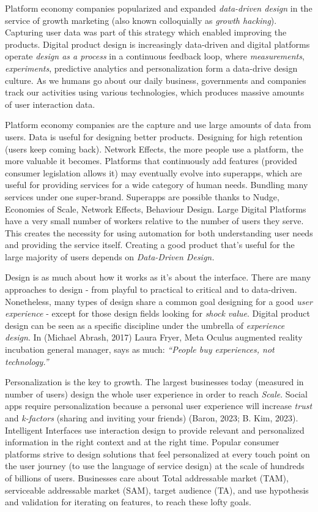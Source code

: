 \documentclass[
  12pt,
  letterpaper,
  DIV=11,
  numbers=noendperiod]{scrartcl}
\begin{document}
Platform economy companies popularized and expanded \emph{data-driven
design} in the service of growth marketing (also known colloquially as
\emph{growth hacking}). Capturing user data was part of this strategy
which enabled improving the products. Digital product design is
increasingly data-driven and digital platforms operate \emph{design as a
process} in a continuous feedback loop, where \emph{measurements},
\emph{experiments}, predictive analytics and personalization form a
data-drive design culture. As we humans go about our daily business,
governments and companies track our activities using various
technologies, which produces massive amounts of user interaction data.

Platform economy companies are the capture and use large amounts of data
from users. Data is useful for designing better products. Designing for
high retention (users keep coming back). Network Effects, the more
people use a platform, the more valuable it becomes. Platforms that
continuously add features (provided consumer legislation allows it) may
eventually evolve into superapps, which are useful for providing
services for a wide category of human needs. Bundling many services
under one super-brand. Superapps are possible thanks to Nudge, Economies
of Scale, Network Effects, Behaviour Design. Large Digital Platforms
have a very small number of workers relative to the number of users they
serve. This creates the necessity for using automation for both
understanding user needs and providing the service itself. Creating a
good product that's useful for the large majority of users depends on
\emph{Data-Driven Design.}

Design is as much about how it works as it's about the interface. There
are many approaches to design - from playful to practical to critical
and to data-driven. Nonetheless, many types of design share a common
goal designing for a good \emph{user experience} - except for those
design fields looking for \emph{shock value}. Digital product design can
be seen as a specific discipline under the umbrella of \emph{experience
design}. In (Michael Abrash, 2017) Laura Fryer, Meta Oculus augmented
reality incubation general manager, says as much: \emph{``People buy
experiences, not technology.''}

Personalization is the key to growth. The largest businesses today
(measured in number of users) design the whole user experience in order
to reach \emph{Scale}. Social apps require personalization because a
personal user experience will increase \emph{trust} and \emph{k-factors}
(sharing and inviting your friends) (Baron, 2023; B. Kim, 2023).
Intelligent Interfaces use interaction design to provide relevant and
personalized information in the right context and at the right time.
Popular consumer platforms strive to design solutions that feel
personalized at every touch point on the user journey (to use the
language of service design) at the scale of hundreds of billions of
users. Businesses care about Total addressable market (TAM), serviceable
addressable market (SAM), target audience (TA), and use hypothesis and
validation for iterating on features, to reach these lofty goals.
\end{document}
